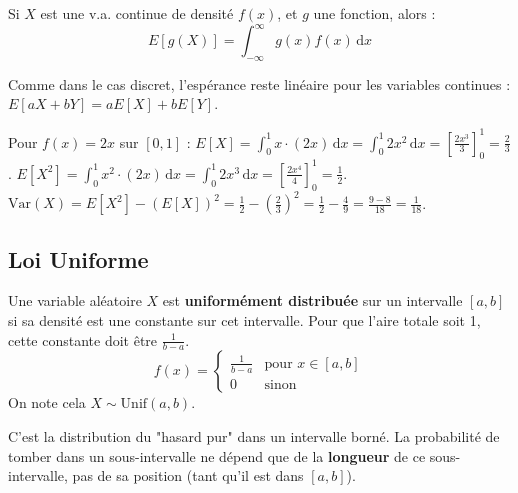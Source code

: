 \begin{theorembox}
Si $X$ est une v.a. continue de densité $f(x)$, et $g$ une fonction, alors :
$$ E[g(X)] = \int_{-\infty}^{\infty} g(x) f(x) \, \mathrm{d}x $$
\end{theorembox}

\begin{remarquebox}
Comme dans le cas discret, l'espérance reste linéaire pour les variables continues :
$E[aX+bY] = aE[X]+bE[Y]$.
\end{remarquebox}

\begin{examplebox}
Pour $f(x) = 2x$ sur $[0, 1]$ :
\newline
$E[X] = \int_0^1 x \cdot (2x) \, \mathrm{d}x = \int_0^1 2x^2 \, \mathrm{d}x = \left[ \frac{2x^3}{3} \right]_0^1 = \frac{2}{3}$.
\newline
$E[X^2] = \int_0^1 x^2 \cdot (2x) \, \mathrm{d}x = \int_0^1 2x^3 \, \mathrm{d}x = \left[ \frac{2x^4}{4} \right]_0^1 = \frac{1}{2}$.
\newline
$\text{Var}(X) = E[X^2] - (E[X])^2 = \frac{1}{2} - \left(\frac{2}{3}\right)^2 = \frac{1}{2} - \frac{4}{9} = \frac{9-8}{18} = \frac{1}{18}$.
\end{examplebox}

\subsection{Loi Uniforme}

\begin{definitionbox}
Une variable aléatoire $X$ est \textbf{uniformément distribuée} sur un intervalle $[a, b]$ si sa densité est une constante sur cet intervalle. Pour que l'aire totale soit 1, cette constante doit être $\frac{1}{b-a}$.
$$ f(x) = \begin{cases} \frac{1}{b-a} & \text{pour } x \in [a, b] \\ 0 & \text{sinon} \end{cases} $$
On note cela $X \sim \text{Unif}(a, b)$.
\end{definitionbox}

\begin{intuitionbox}
C'est la distribution du "hasard pur" dans un intervalle borné. La probabilité de tomber dans un sous-intervalle ne dépend que de la \textbf{longueur} de ce sous-intervalle, pas de sa position (tant qu'il est dans $[a, b]$). 
\end{intuitionbox}

